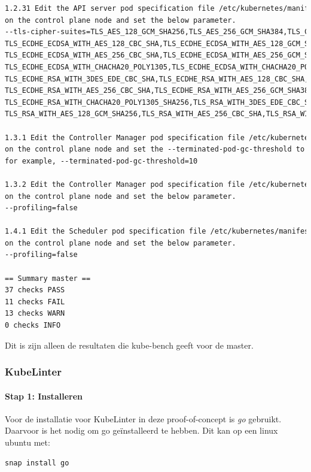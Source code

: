 \begin{lstlisting}[language=tex, caption={Remediations master van kube-bench}]
1.2.31 Edit the API server pod specification file /etc/kubernetes/manifests/kube-apiserver.yaml
on the control plane node and set the below parameter.
--tls-cipher-suites=TLS_AES_128_GCM_SHA256,TLS_AES_256_GCM_SHA384,TLS_CHACHA20_POLY1305_SHA256,
TLS_ECDHE_ECDSA_WITH_AES_128_CBC_SHA,TLS_ECDHE_ECDSA_WITH_AES_128_GCM_SHA256,
TLS_ECDHE_ECDSA_WITH_AES_256_CBC_SHA,TLS_ECDHE_ECDSA_WITH_AES_256_GCM_SHA384,
TLS_ECDHE_ECDSA_WITH_CHACHA20_POLY1305,TLS_ECDHE_ECDSA_WITH_CHACHA20_POLY1305_SHA256,
TLS_ECDHE_RSA_WITH_3DES_EDE_CBC_SHA,TLS_ECDHE_RSA_WITH_AES_128_CBC_SHA,TLS_ECDHE_RSA_WITH_AES_128_GCM_SHA256,
TLS_ECDHE_RSA_WITH_AES_256_CBC_SHA,TLS_ECDHE_RSA_WITH_AES_256_GCM_SHA384,TLS_ECDHE_RSA_WITH_CHACHA20_POLY1305,
TLS_ECDHE_RSA_WITH_CHACHA20_POLY1305_SHA256,TLS_RSA_WITH_3DES_EDE_CBC_SHA,TLS_RSA_WITH_AES_128_CBC_SHA,
TLS_RSA_WITH_AES_128_GCM_SHA256,TLS_RSA_WITH_AES_256_CBC_SHA,TLS_RSA_WITH_AES_256_GCM_SHA384

1.3.1 Edit the Controller Manager pod specification file /etc/kubernetes/manifests/kube-controller-manager.yaml
on the control plane node and set the --terminated-pod-gc-threshold to an appropriate threshold,
for example, --terminated-pod-gc-threshold=10

1.3.2 Edit the Controller Manager pod specification file /etc/kubernetes/manifests/kube-controller-manager.yaml
on the control plane node and set the below parameter.
--profiling=false

1.4.1 Edit the Scheduler pod specification file /etc/kubernetes/manifests/kube-scheduler.yaml file
on the control plane node and set the below parameter.
--profiling=false

== Summary master ==
37 checks PASS
11 checks FAIL
13 checks WARN
0 checks INFO

\end{lstlisting}

Dit is zijn alleen de resultaten die kube-bench geeft voor de master. 

\subsubsection{KubeLinter}

\paragraph{Stap 1: Installeren}

Voor de installatie voor KubeLinter in deze proof-of-concept is \textit{go} gebruikt. 
Daarvoor is het nodig om go geïnstalleerd te hebben. Dit kan op een linux ubuntu met:
\begin{lstlisting}[language=tex, caption={installeer go}]
snap install go
\end{lstlisting}

